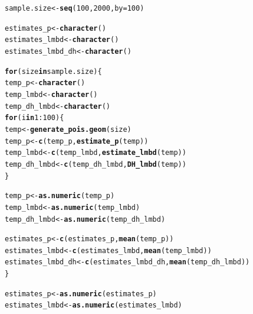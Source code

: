 \documentclass{article}\usepackage[]{graphicx}\usepackage[]{color}
\makeatletter
\newcommand{\hlnum}[1]{\textcolor[rgb]{0.686,0.059,0.569}{#1}}%
\newcommand{\hlopt}[1]{\textcolor[rgb]{0,0,0}{#1}}%
\newcommand{\hlstd}[1]{\textcolor[rgb]{0.345,0.345,0.345}{#1}}%
\newcommand{\hlkwa}[1]{\textcolor[rgb]{0.161,0.373,0.58}{\textbf{#1}}}%
\newcommand{\hlkwb}[1]{\textcolor[rgb]{0.69,0.353,0.396}{#1}}%
\newcommand{\hlkwc}[1]{\textcolor[rgb]{0.333,0.667,0.333}{#1}}%
\newcommand{\hlkwd}[1]{\textcolor[rgb]{0.737,0.353,0.396}{\textbf{#1}}}%
\newenvironment{kframe}{%
 \def\at@end@of@kframe{}%
 \ifinner\ifhmode%
  \def\at@end@of@kframe{\end{minipage}}%
  \begin{minipage}{\columnwidth}%
 \fi\fi%
 \def\FrameCommand##1{\hskip\@totalleftmargin \hskip-\fboxsep
 \colorbox{shadecolor}{##1}\hskip-\fboxsep
     \hskip-\linewidth \hskip-\@totalleftmargin \hskip\columnwidth}%
 \MakeFramed {\advance\hsize-\width
   \@totalleftmargin\z@ \linewidth\hsize
   \@setminipage}}%
 {\par\unskip\endMakeFramed%
 \at@end@of@kframe}
\newenvironment{knitrout}{}{} %
\makeatother
\begin{document}
\begin{knitrout}
\color{fgcolor}\begin{kframe}
\begin{alltt}
\hlstd{sample.size} \hlkwb{<-} \hlkwd{seq}\hlstd{(}\hlnum{100}\hlstd{,} \hlnum{2000}\hlstd{,} \hlkwc{by} \hlstd{=} \hlnum{100}\hlstd{)}

\hlstd{estimates_p} \hlkwb{<-} \hlkwd{character}\hlstd{()}
\hlstd{estimates_lmbd} \hlkwb{<-} \hlkwd{character}\hlstd{()}
\hlstd{estimates_lmbd_dh} \hlkwb{<-} \hlkwd{character}\hlstd{()}

\hlkwa{for} \hlstd{(size} \hlkwa{in} \hlstd{sample.size) \{}
  \hlstd{temp_p} \hlkwb{<-} \hlkwd{character}\hlstd{()}
  \hlstd{temp_lmbd} \hlkwb{<-} \hlkwd{character}\hlstd{()}
  \hlstd{temp_dh_lmbd} \hlkwb{<-} \hlkwd{character}\hlstd{()}
  \hlkwa{for} \hlstd{(i} \hlkwa{in} \hlnum{1}\hlopt{:}\hlnum{100}\hlstd{) \{}
    \hlstd{temp} \hlkwb{<-} \hlkwd{generate_pois.geom}\hlstd{(size)}
    \hlstd{temp_p} \hlkwb{<-} \hlkwd{c}\hlstd{(temp_p,} \hlkwd{estimate_p}\hlstd{(temp))}
    \hlstd{temp_lmbd} \hlkwb{<-} \hlkwd{c}\hlstd{(temp_lmbd,} \hlkwd{estimate_lmbd}\hlstd{(temp))}
    \hlstd{temp_dh_lmbd} \hlkwb{<-} \hlkwd{c}\hlstd{(temp_dh_lmbd,} \hlkwd{DH_lmbd}\hlstd{(temp))}
  \hlstd{\}}

  \hlstd{temp_p} \hlkwb{<-} \hlkwd{as.numeric}\hlstd{(temp_p)}
  \hlstd{temp_lmbd} \hlkwb{<-} \hlkwd{as.numeric}\hlstd{(temp_lmbd)}
  \hlstd{temp_dh_lmbd} \hlkwb{<-} \hlkwd{as.numeric}\hlstd{(temp_dh_lmbd)}

  \hlstd{estimates_p} \hlkwb{<-} \hlkwd{c}\hlstd{(estimates_p,} \hlkwd{mean}\hlstd{(temp_p))}
  \hlstd{estimates_lmbd} \hlkwb{<-} \hlkwd{c}\hlstd{(estimates_lmbd,} \hlkwd{mean}\hlstd{(temp_lmbd))}
  \hlstd{estimates_lmbd_dh} \hlkwb{<-} \hlkwd{c}\hlstd{(estimates_lmbd_dh,} \hlkwd{mean}\hlstd{(temp_dh_lmbd))}
\hlstd{\}}

\hlstd{estimates_p} \hlkwb{<-} \hlkwd{as.numeric}\hlstd{(estimates_p)}
\hlstd{estimates_lmbd} \hlkwb{<-} \hlkwd{as.numeric}\hlstd{(estimates_lmbd)}



\end{alltt}
\end{kframe}
\end{knitrout}
\end{document}

